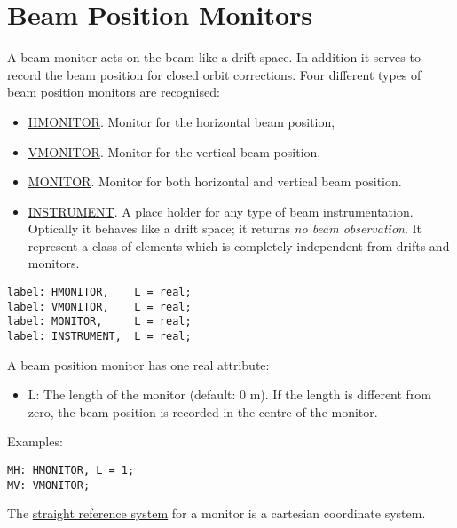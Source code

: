 
\section{Beam Position Monitors}

A beam monitor acts on the beam like a drift space. In addition it
serves to record the beam position for closed orbit corrections. Four
different types of beam position monitors are recognised:  

\begin{itemize}
   \item \href{hmon}{HMONITOR}. Monitor for the horizontal beam position, 
   \item \href{vmon}{VMONITOR}. Monitor for the vertical beam position, 
   \item \href{mon}{MONITOR}. Monitor for both horizontal and vertical beam position. 
   \item \href{inst}{INSTRUMENT}. A place holder for any type of beam
     instrumentation. Optically it behaves like a drift space; it
     returns \emph{no beam observation}. It represent a class of
     elements which is completely independent from drifts and monitors.  
\end{itemize}

\begin{verbatim}
label: HMONITOR,    L = real;
label: VMONITOR,    L = real;
label: MONITOR,     L = real;
label: INSTRUMENT,  L = real;
\end{verbatim} 

A beam position monitor has one real attribute: 
\begin{itemize}
   \item L: The length of the monitor (default: 0 m). If the length is
     different from zero, the beam position is recorded in the centre of
     the monitor.  
\end{itemize} 

Examples: 
\begin{verbatim}
MH: HMONITOR, L = 1;
MV: VMONITOR;
\end{verbatim} 

The \href{local_system.html#straight}{straight reference system} for a
monitor is a cartesian coordinate system.  

